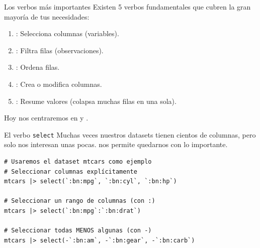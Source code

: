 \documentclass[8pt]{beamer}
\begin{document}
\begin{frame}[fragile]{Los verbos m\'as importantes}
	Existen 5 verbos fundamentales que cubren la gran mayoría de tus necesidades:
	\begin{enumerate}
		\item {}: Selecciona columnas (variables).
		\item {}: Filtra filas (observaciones).
		\item {}: Ordena filas.
		\item {}: Crea o modifica columnas.
		\item {}: Resume valores (colapsa muchas filas en una sola).
	\end{enumerate}
	
	Hoy nos centraremos en  y .
\end{frame}



\begin{frame}[fragile]{El verbo \texttt{select}}
	Muchas veces nuestros datasets tienen cientos de columnas, pero solo nos interesan unas pocas.  nos permite quedarnos con lo importante.
\begin{lstlisting}[style=RScript]
# Usaremos el dataset mtcars como ejemplo
# Seleccionar columnas explícitamente
mtcars |> select(`:bn:mpg`, `:bn:cyl`, `:bn:hp`)

# Seleccionar un rango de columnas (con :)
mtcars |> select(`:bn:mpg`:`:bn:drat`)

# Seleccionar todas MENOS algunas (con -)
mtcars |> select(-`:bn:am`, -`:bn:gear`, -`:bn:carb`)	
\end{lstlisting}
\end{frame}
\end{document}
